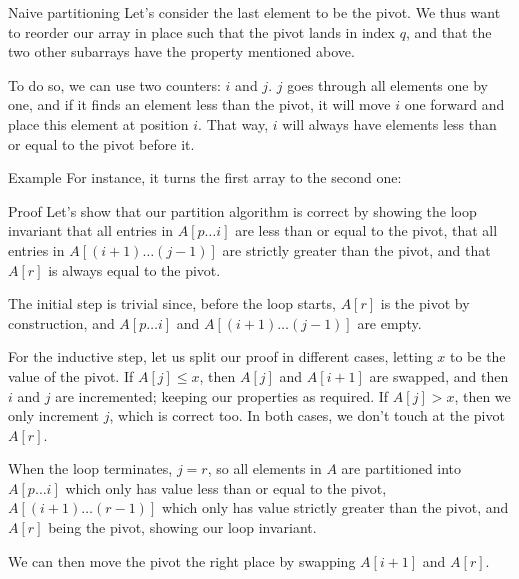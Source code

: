 \documentclass[a4paper]{article}
\begin{document}
\begin{parag}{Naive partitioning}
    Let's consider the last element to be the pivot. We thus want to reorder our array in place such that the pivot lands in index $q$, and that the two other subarrays have the property mentioned above. 

    To do so, we can use two counters: $i$ and $j$. $j$ goes through all elements one by one, and if it finds an element less than the pivot, it will move $i$ one forward and place this element at position $i$. That way, $i$ will always have elements less than or equal to the pivot before it.
    
    \begin{subparag}{Example}
        For instance, it turns the first array to the second one:
    \end{subparag}

    \begin{subparag}{Proof}
        Let's show that our partition algorithm is correct by showing the loop invariant that all entries in $A\left[p \ldots i\right]$ are less than or equal to the pivot, that all entries in $A\left[\left(i+1\right) \ldots \left(j-1\right)\right]$ are strictly greater than the pivot, and that $A\left[r\right]$ is always equal to the pivot.

        The initial step is trivial since, before the loop starts, $A\left[r\right]$ is the pivot by construction, and $A\left[p \ldots i\right]$ and $A\left[\left(i+1\right)\ldots\left(j-1\right)\right]$ are empty.

        For the inductive step, let us split our proof in different cases, letting $x$ to be the value of the pivot. If $A\left[j\right] \leq x$, then $A\left[j\right]$ and $A\left[i+1\right]$ are swapped, and then $i$ and $j$ are incremented; keeping our properties as required. If $A\left[j\right] > x$, then we only increment $j$, which is correct too. In both cases, we don't touch at the pivot $A\left[r\right]$.

        When the loop terminates, $j=r$, so all elements in $A$ are partitioned into $A\left[p \ldots i\right]$ which only has value less than or equal to the pivot, $A\left[\left(i+1\right) \ldots \left(r-1\right)\right]$ which only has value strictly greater than the pivot, and $A\left[r\right]$ being the pivot, showing our loop invariant.

        We can then move the pivot the right place by swapping $A\left[i+1\right]$ and $A\left[r\right]$.


\end{subparag}
\end{parag}
\end{document}
